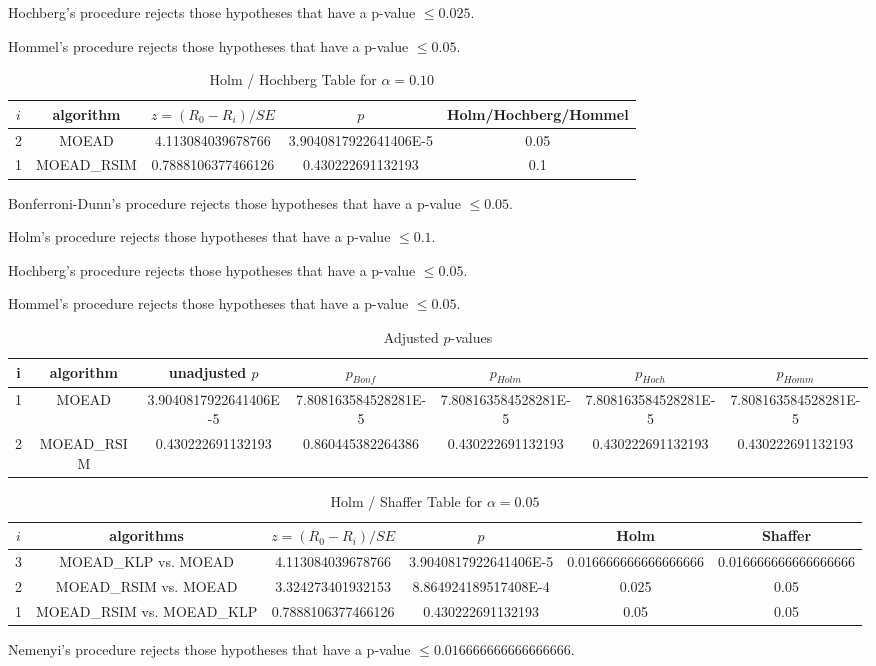 \documentclass[a4paper,10pt]{article}
\begin{document}
\begin{landscape}
Hochberg's procedure rejects those hypotheses that have a p-value $\le0.025$.


Hommel's procedure rejects those hypotheses that have a p-value $\le0.05$.


\begin{table}[!htp]
\centering\tiny
\caption{Holm / Hochberg Table for $\alpha=0.10$}
\begin{tabular}{ccccc}
$i$&algorithm&$z=(R_0 - R_i)/SE$&$p$&Holm/Hochberg/Hommel\\
\hline
2&MOEAD&4.113084039678766&3.9040817922641406E-5&0.05\\
1&MOEAD_RSIM&0.7888106377466126&0.430222691132193&0.1\\
\hline
\end{tabular}
\end{table}
Bonferroni-Dunn's procedure rejects those hypotheses that have a p-value $\le0.05$.


Holm's procedure rejects those hypotheses that have a p-value $\le0.1$.


Hochberg's procedure rejects those hypotheses that have a p-value $\le0.05$.


Hommel's procedure rejects those hypotheses that have a p-value $\le0.05$.


\begin{table}[!htp]
\centering\tiny
\caption{Adjusted $p$-values}
\begin{tabular}{ccccccc}
i&algorithm&unadjusted $p$&$p_{Bonf}$&$p_{Holm}$&$p_{Hoch}$&$p_{Homm}$\\
\hline
1&MOEAD&3.9040817922641406E-5&7.808163584528281E-5&7.808163584528281E-5&7.808163584528281E-5&7.808163584528281E-5\\
2&MOEAD_RSIM&0.430222691132193&0.860445382264386&0.430222691132193&0.430222691132193&0.430222691132193\\
\hline
\end{tabular}
\end{table}

\begin{table}[!htp]
\centering\tiny
\caption{Holm / Shaffer Table for $\alpha=0.05$}
\begin{tabular}{cccccc}
$i$&algorithms&$z=(R_0 - R_i)/SE$&$p$&Holm&Shaffer\\
\hline
3&MOEAD_KLP vs. MOEAD&4.113084039678766&3.9040817922641406E-5&0.016666666666666666&0.016666666666666666\\
2&MOEAD_RSIM vs. MOEAD&3.324273401932153&8.864924189517408E-4&0.025&0.05\\
1&MOEAD_RSIM vs. MOEAD_KLP&0.7888106377466126&0.430222691132193&0.05&0.05\\
\hline
\end{tabular}
\end{table}
Nemenyi's procedure rejects those hypotheses that have a p-value $\le0.016666666666666666$.



\end{landscape}
\end{document}
